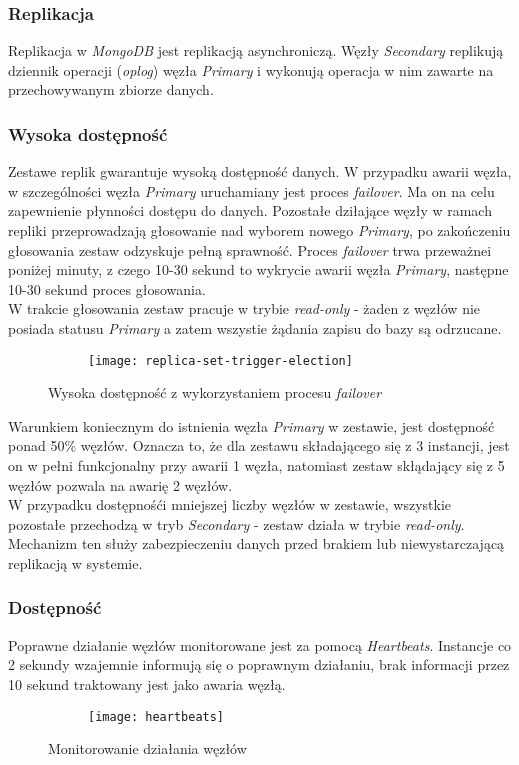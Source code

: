 \subsubsection{Replikacja} 
Replikacja w \textit{MongoDB} jest replikacją asynchroniczą. Węzły \textit{Secondary} replikują dziennik operacji (\textit{oplog}) węzła \textit{Primary} i wykonują operacja w nim zawarte na przechowywanym zbiorze danych.

\subsubsection{Wysoka dostępność}
Zestawe replik gwarantuje wysoką dostępność danych. W przypadku awarii węzła, w szczególności węzła \textit{Primary} uruchamiany jest proces \textit{failover}. Ma on na celu zapewnienie płynności dostępu do danych. Pozostałe dziłające węzły w ramach repliki przeprowadzają głosowanie nad wyborem nowego \textit{Primary}, po zakończeniu głosowania zestaw odzyskuje pełną sprawność. Proces \textit{failover} trwa przeważnei poniżej minuty, z czego 10-30 sekund to wykrycie awarii węzła \textit{Primary}, następne 10-30 sekund proces głosowania. \\
W trakcie głosowania zestaw pracuje w trybie \textit{read-only} - żaden z węzłów nie posiada statusu \textit{Primary} a zatem wszystie żądania zapisu do bazy są odrzucane. \\

\begin{figure}[H]
	\centering
	\begin{subfigure}{.5\textwidth}
		\texttt{[image: replica-set-trigger-election]}
		\label{fig:sub2}
	\end{subfigure}
	\caption{Wysoka dostępność z wykorzystaniem procesu \textit{failover}}
	\label{fig:test}
\end{figure}

Warunkiem koniecznym do istnienia węzła \textit{Primary} w zestawie, jest dostępność ponad 50\% węzłów. Oznacza to, że dla zestawu składającego się z 3 instancji, jest on w pełni funkcjonalny przy awarii 1 węzła, natomiast zestaw skłądający się z 5 węzłów pozwala na awarię 2 węzłów. \\
W przypadku dostępnośći mniejszej liczby węzłów w zestawie, wszystkie pozostałe przechodzą w tryb \textit{Secondary} - zestaw działa w trybie \textit{read-only}. Mechanizm ten służy zabezpieczeniu danych przed brakiem lub niewystarczającą replikacją w systemie.

\subsubsection{Dostępność}
Poprawne działanie węzłów monitorowane jest za pomocą \textit{Heartbeats}. Instancje co 2 sekundy wzajemnie informują się o poprawnym działaniu, brak informacji przez 10 sekund traktowany jest jako awaria węzłą.

\begin{figure}[H]
	\centering
	\begin{subfigure}{.5\textwidth}
		\texttt{[image: heartbeats]}
		\label{fig:sub2}
	\end{subfigure}
	\caption{Monitorowanie działania węzłów}
	\label{fig:test}
\end{figure}
